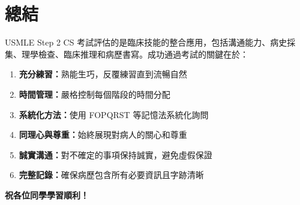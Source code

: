 \documentclass[12pt,a4paper]{article}
\begin{document}
\section{總結}

USMLE Step 2 CS 考試評估的是臨床技能的整合應用，包括溝通能力、病史採集、理學檢查、臨床推理和病歷書寫。成功通過考試的關鍵在於：

\begin{enumerate}
    \item \textbf{充分練習：}熟能生巧，反覆練習直到流暢自然
    \item \textbf{時間管理：}嚴格控制每個階段的時間分配
    \item \textbf{系統化方法：}使用 FOPQRST 等記憶法系統化詢問
    \item \textbf{同理心與尊重：}始終展現對病人的關心和尊重
    \item \textbf{誠實溝通：}對不確定的事項保持誠實，避免虛假保證
    \item \textbf{完整記錄：}確保病歷包含所有必要資訊且字跡清晰
\end{enumerate}

\vspace{1cm}

\begin{center}
\textcolor{emergency_red}{\Large\textbf{祝各位同學學習順利！}}
\end{center}
\end{document}
